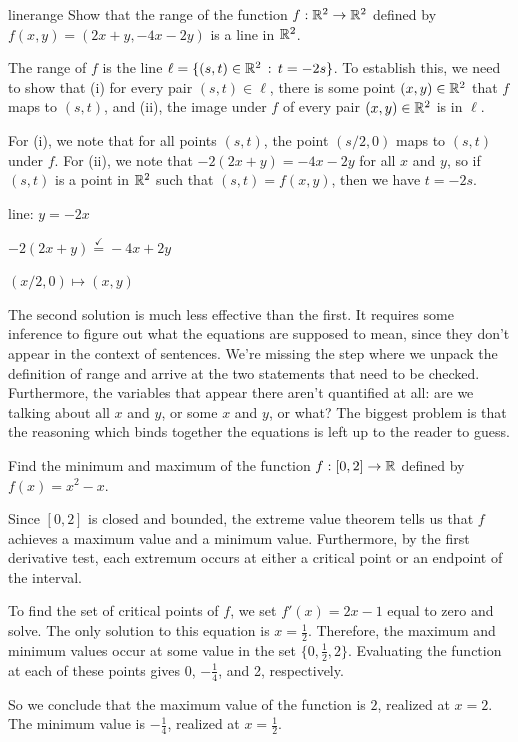 \documentclass[prettycode,shellescape]{watsonbook}
\begin{document}
\begin{example}{}{linerange} 
  Show that the range of the function $f:\mathbb{R}^2 \to \mathbb{R}^2$ defined by
  $f(x,y) = (2x + y, -4x - 2y)$ is a line in $\mathbb{R}^2$.
\end{example}

\begin{solution}[title = Good solution] 
  The range of $f$ is the line $\ell = \{(s,t) \in \mathbb{R}^2 \,: \, t =
  -2s\}$. To establish this, we need to show that (i) for every pair $(s,t) \in
  \ell$, there is some point $(x,y) \in \mathbb{R}^2$ that $f$ maps to
  $(s,t)$, and (ii), the image under $f$ of every pair $(x,y) \in
  \mathbb{R}^2$  is in $\ell$.
  
  For (i), we note that for all points $(s,t)$, the point $(s/2,0)$
  maps to $(s,t)$ under $f$. For (ii), we note that
  $-2(2x + y) = -4x - 2y$ for all $x$ and $y$, so if $(s,t)$ is a
  point in $\mathbb{R}^2$ such that $(s,t) = f(x,y)$, then we have
  $t = -2s$. 
\end{solution}

\begin{solution}[title = Solution that needs improvement] 
  line: $y = -2x$

  $-2(2x + y) \stackrel{\checkmark}{=} -4x  +2y$

  $(x/2 , 0) \mapsto (x,y)$
\end{solution}

The second solution is much less effective than the first. It requires
some inference to figure out what the equations are supposed to mean,
since they don't appear in the context of sentences. We're missing the
step where we unpack the definition of range and arrive at the two
statements that need to be checked. Furthermore, the variables that
appear there aren't quantified at all: are we talking about all $x$
and $y$, or some $x$ and $y$, or what? The biggest problem is that the
reasoning which binds together the equations is left up to the reader
to guess.

\begin{example}{}{}
  Find the minimum and maximum of the function $f: [0,2] \to \mathbb{R}$
  defined by $f(x) = x^2 - x$.
\end{example}

\begin{solution}[title=Good solution] 
  Since $[0,2]$ is closed and bounded, the extreme value theorem tells
  us that $f$ achieves a maximum value and a minimum
  value. Furthermore, by the first derivative test, each extremum
  occurs at either a critical point or an endpoint of the interval.

  To find the set of critical points of $f$, we set $f'(x) = 2x - 1$
  equal to zero and solve. The only solution to this equation is
  $x = \tfrac{1}{2}$. Therefore, the maximum and minimum values occur
  at some value in the set $\{0,\tfrac{1}{2}, 2\}$. Evaluating the
  function at each of these points gives 0, $-\tfrac{1}{4}$, and 2,
  respectively.

  So we conclude that the maximum value of the function is
  $\boxed{2}$, realized at $x=2$. The minimum value is
  $\boxed{-\tfrac{1}{4}}$, realized at $x = \tfrac{1}{2}$.
\end{solution}
\end{document}
